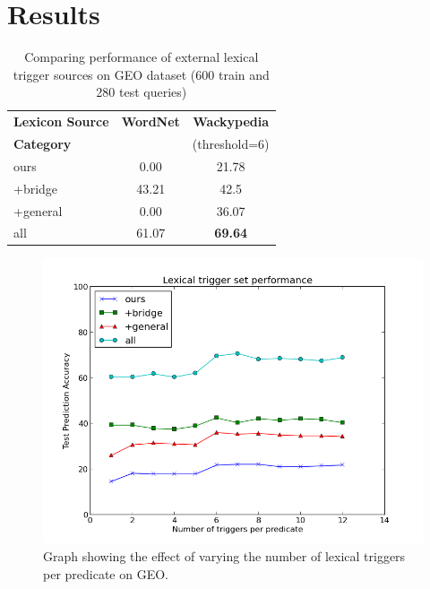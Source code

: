 \documentclass[11pt]{article}
\begin{document}
\section{Results}
\begin{center}
\begin{table}[!h]
\centering
\begin{tabular}{|l|c|c|}
\hline
{\textbf{Lexicon Source}} & {\textbf{WordNet} } & {\textbf{Wackypedia}} \\ %
\textbf{Category}&  & (threshold=6) \\
\hline
ours     & 0.00 & {{21.78}} \\ \hline
+bridge  & 43.21 & {{42.5}} \\ \hline
+general & 0.00 & {{36.07}} \\ \hline
all      & 61.07 & {\textbf{69.64}} \\ \hline
\end{tabular}
\caption{Comparing performance of external lexical trigger sources on GEO dataset (600 train and 280 test queries)} \label{tab:normal}
\end{table}
\end{center}

\begin{figure}[!htb]
\begin{center}
  \includegraphics[scale=0.45]{figs/ablationTest.png}
\caption{Graph showing the effect of varying the number of lexical triggers per predicate on GEO.}
\end{center}
\end{figure}
\end{document}
